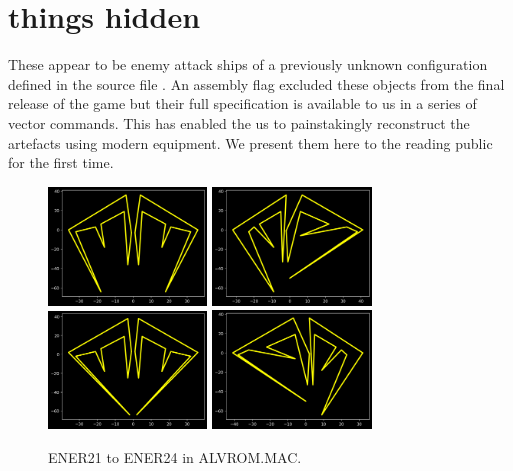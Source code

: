\chapter{things hidden}
\label{sec:things_hidden}
\lhead[tempest]{}
\lstset{style=6502Style}


These appear to be enemy attack ships of a previously unknown configuration defined in the source
file . An assembly flag excluded these objects from the final release of the game
but their full specification is available to us in a series of vector commands. This has enabled the
us to painstakingly reconstruct the artefacts using modern equipment. We present them here to the reading public for the first time.

\begin{figure}[H]
  \centering
        \includegraphics[width=4.22cm]{src/tempest_unused/ENER21.png}%
        \hspace{0.2cm}
        \includegraphics[width=4.22cm]{src/tempest_unused/ENER22.png}%
        \hspace{0.2cm}
        \includegraphics[width=4.22cm]{src/tempest_unused/ENER23.png}%
        \hspace{0.2cm}
        \includegraphics[width=4.22cm]{src/tempest_unused/ENER24.png}%
  \caption*{ENER21 to ENER24 in ALVROM.MAC.}
\end{figure}


